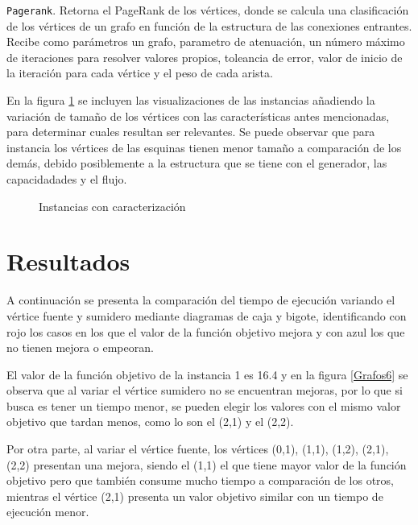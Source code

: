 \documentclass{article}
\begin{document}
\texttt{Pagerank}. Retorna el PageRank de los vértices, donde se calcula una clasificación de los vértices de un grafo en función de la estructura de las conexiones entrantes. Recibe como parámetros un grafo, parametro de atenuación, un número máximo de iteraciones para resolver valores propios, toleancia de error, valor de inicio de la iteración para cada vértice y el peso de cada arista.  


En la figura \ref{Grafos5} se incluyen las visualizaciones de las instancias añadiendo la variación de tamaño de los vértices con las características antes mencionadas, para determinar cuales resultan ser relevantes. Se puede observar que para instancia los vértices de las esquinas tienen menor tamaño a comparación de los demás, debido posiblemente a la estructura que se tiene con el generador, las capacidadades y el flujo.

\begin{figure}[H]
\centering
{}\hspace{5mm}
\vspace{5mm}
\hspace{5mm}
\vspace{5mm}
\caption{Instancias con caracterización} \label{Grafos5}
\end{figure}

\section{Resultados}
A continuación se presenta la comparación del tiempo de ejecución variando el vértice fuente y sumidero mediante  diagramas de caja y bigote, identificando con rojo los casos en los que el valor de la función objetivo mejora y con azul los que no tienen mejora o empeoran. 

El valor de la función objetivo de la instancia 1 es 16.4 y en la figura \ref{Grafos6} se observa que al variar el vértice sumidero no se encuentran mejoras, por lo que si busca es tener un tiempo menor, se pueden elegir los valores con el mismo valor objetivo que tardan menos, como lo son el (2,1) y el (2,2).

Por otra parte, al variar el vértice fuente, los vértices (0,1), (1,1), (1,2), (2,1), (2,2) presentan una mejora, siendo el (1,1) el que tiene mayor valor  de la función objetivo pero que también consume mucho tiempo a comparación de los otros, mientras el vértice (2,1) presenta un valor objetivo similar con un tiempo de ejecución menor. 
\end{document}
